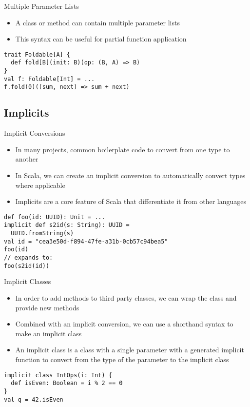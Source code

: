 \documentclass{beamer}
\begin{document}
\begin{frame}[fragile]{Multiple Parameter Lists}
\begin{itemize}
\item A class or method can contain multiple parameter lists
\item This syntax can be useful for partial function application
\end{itemize}
\begin{lstlisting}
trait Foldable[A] {
  def fold[B](init: B)(op: (B, A) => B)
}
val f: Foldable[Int] = ...
f.fold(0)((sum, next) => sum + next)
\end{lstlisting}
\end{frame}


\subsection{Implicits}

\begin{frame}[fragile]{Implicit Conversions}
\begin{itemize}
\item In many projects, common boilerplate code to convert from one type to another
\item In Scala, we can create an implicit conversion to automatically convert types
where applicable
\item Implicits are a core feature of Scala that differentiate it from other languages
\end{itemize}
\begin{lstlisting}
def foo(id: UUID): Unit = ...
implicit def s2id(s: String): UUID =
  UUID.fromString(s)
val id = "cea3e50d-f894-47fe-a31b-0cb57c94bea5"
foo(id)
// expands to:
foo(s2id(id))
\end{lstlisting}
\end{frame}

\begin{frame}[fragile]{Implicit Classes}
\begin{itemize}
\item In order to add methods to third party classes, we can wrap the class and
provide new methods
\item Combined with an implicit conversion, we can use a shorthand syntax to make
an implicit class
\item An implicit class is a class with a single parameter with a generated implicit
function to convert from the type of the parameter to the implicit class
\end{itemize}
\begin{lstlisting}
implicit class IntOps(i: Int) {
  def isEven: Boolean = i % 2 == 0
}
val q = 42.isEven
\end{lstlisting}
\end{frame}
\end{document}
